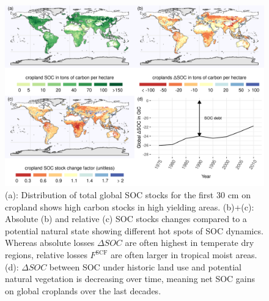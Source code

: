\documentclass[gc, manuscript]{copernicus}
\begin{document}
\begin{figure}[h]
\includegraphics[width=18cm]{../ResultNotebooks/Output/Images/4panelfigure} \caption{(a): Distribution of total global SOC stocks for the first 30 cm on cropland shows high carbon stocks in high yielding areas. (b)+(c): Absolute (b) and relative (c) SOC stocks changes compared to a potential natural state showing different hot spots of SOC dynamics. Whereas absolute losses $\Delta SOC$ are often highest in temperate dry regions, relative losses $F^\mathrm{SCF}$ are often larger in tropical moist areas. (d): $\Delta SOC$ between SOC under historic land use and potential natural vegetation is decreasing over time, meaning net SOC gains on global croplands over the last decades. }\label{fig:SOCmaps}
\end{figure}
\end{document}
